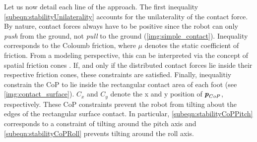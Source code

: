Let us now detail each line of the approach. 
The first inequality \cref{subeqn:stabilityUnilaterality} accounts for the unilaterality of the contact force. By nature, contact forces always have to be positive since the robot can only \textit{push} from the ground, not \textit{pull} to the ground (\cref{img:simple_contact}). 
Inequality  corresponds to the Coloumb friction, where $\mu$ denotes the static coefficient of friction. From a modeling perspective, this can be interpreted via the concept of spatial friction cones \cite{kao2016contact}. If, and only if the distributed contact forces lie inside their respective friction cones, these constraints are satisfied. 
Finally, inequalitiy  constrain the \gls{CoP} to lie inside the rectangular contact area of each foot (see \cref{img:contact_surface}). $C_x$ and $C_y$ denote the x and y position of $\bm{\mathit{p}}_{CoP}$, respectively. These \gls{CoP} constraints prevent the robot from tilting about the edges of the rectangular surface contact. In particular, \cref{subeqn:stabilityCoPPitch} corresponds to a constraint of tilting around the pitch axis and \cref{subeqn:stabilityCoPRoll} prevents tilting around the roll axis.

